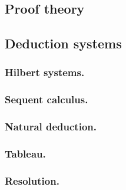 \subsection{Proof theory}

\subsection{Deduction systems}

\subsubsection{Hilbert systems.}

\subsubsection{Sequent calculus.}

\subsubsection{Natural deduction.}

\subsubsection{Tableau.}

\subsubsection{Resolution.}

